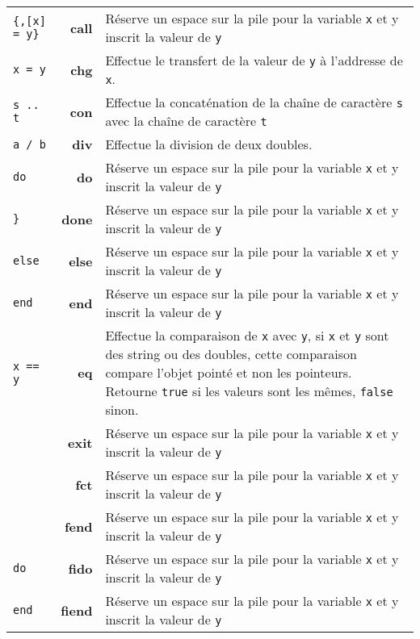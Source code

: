 \documentclass{article}
\begin{document}
\begin{longtable}{p{1.3cm} r p{12cm}}
  {\lstset{style=lua}\lstinline${,[x] = y}$} & \textbf{call} & Réserve un espace sur la pile pour la variable \texttt{x} et y inscrit la valeur de \texttt{y}\\
  {\lstinline$x = y$} & \textbf{chg} & Effectue le transfert de la valeur de \texttt{y} à l'addresse de \texttt{x}.\\
  {\lstinline$s .. t$} & \textbf{con} & Effectue la concaténation de la chaîne de caractère \texttt{s} avec la chaîne de caractère \texttt{t}\\
  {\lstinline$a / b$} & \textbf{div} & Effectue la division de deux doubles.\\
  {\lstset{style=lua}\lstinline$do$} & \textbf{do} & Réserve un espace sur la pile pour la variable \texttt{x} et y inscrit la valeur de \texttt{y}\\
  {\lstset{style=lua}\lstinline$}$} & \textbf{done} & Réserve un espace sur la pile pour la variable \texttt{x} et y inscrit la valeur de \texttt{y}\\
  {\lstset{style=lua}\lstinline$else$} & \textbf{else} & Réserve un espace sur la pile pour la variable \texttt{x} et y inscrit la valeur de \texttt{y}\\
  {\lstset{style=lua}\lstinline$end$} & \textbf{end} & Réserve un espace sur la pile pour la variable \texttt{x} et y inscrit la valeur de \texttt{y}\\
  {\lstinline$x == y$} & \textbf{eq} & Effectue la comparaison de \texttt{x} avec \texttt{y}, si \texttt{x} et \texttt{y} sont des string ou des doubles, cette comparaison compare l'objet pointé et non les pointeurs. Retourne {\lstset{style=lua}\lstinline$true$} si les valeurs sont les mêmes, {\lstset{style=lua}\lstinline$false$} sinon.\\
  {\lstset{style=lua}\lstinline$$} & \textbf{exit} & Réserve un espace sur la pile pour la variable \texttt{x} et y inscrit la valeur de \texttt{y}\\
  {\lstset{style=lua}\lstinline$$} & \textbf{fct} & Réserve un espace sur la pile pour la variable \texttt{x} et y inscrit la valeur de \texttt{y}\\
  {\lstset{style=lua}\lstinline$$} & \textbf{fend} & Réserve un espace sur la pile pour la variable \texttt{x} et y inscrit la valeur de \texttt{y}\\
  {\lstset{style=lua}\lstinline$do$} & \textbf{fido} & Réserve un espace sur la pile pour la variable \texttt{x} et y inscrit la valeur de \texttt{y}\\
  {\lstset{style=lua}\lstinline$end$} & \textbf{fiend} & Réserve un espace sur la pile pour la variable \texttt{x} et y inscrit la valeur de \texttt{y}\\

\end{longtable}
\end{document}
